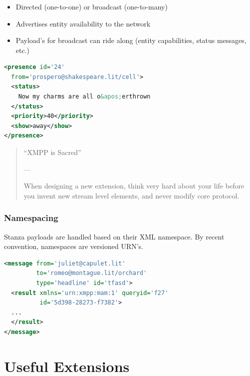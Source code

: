 \documentclass[xelatex,aspectratio=169]{beamer}
\begin{document}
\begin{frame}[fragile]
	\frametitle{}
	\begin{itemize}
	\item Directed (one-to-one) or broadcast (one-to-many)
	\item Advertises entity availability to the network
	\item Payload's for broadcast can ride along (entity capabilities, status
		messages, etc.)
	\end{itemize}
\begin{lstlisting}[frame=single,language=xml]
<presence id='24'
  from='prospero@shakespeare.lit/cell'>
  <status>
    Now my charms are all o&apos;erthrown
  </status>
  <priority>40</priority>
  <show>away</show>
</presence>
\end{lstlisting}
\end{frame}

\begin{frame}
\begin{quotation}
``XMPP is Sacred''
\begin{flushright}
---
\end{flushright}
\vspace*{2em}
When designing a new extension, think very hard about your life before you
invent new stream level elements, and never modify core protocol.
\end{quotation}
\end{frame}

\begin{frame}[fragile]
	\frametitle{Namespacing}
	\begin{flushleft}
		Stanza payloads are handled based on their XML namespace. By recent
		convention, namespaces are versioned URN's.
	\end{flushleft}
\begin{lstlisting}[frame=single,language=xml]
<message from='juliet@capulet.lit'
         to='romeo@montague.lit/orchard'
         type='headline' id='tfasd'>
  <result xmlns='urn:xmpp:mam:1' queryid='f27'
          id='5d398-28273-f7382'>
  ...
  </result>
</message>
\end{lstlisting}
\end{frame}

\section[]{Useful Extensions}
\frame{\sectionpage}
\end{document}
